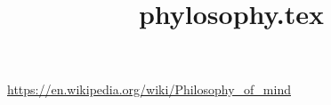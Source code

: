 \documentclass[a4paper]{article}
\title{phylosophy.tex}
\date{}
\begin{document}
    \maketitle

    \url{https://en.wikipedia.org/wiki/Philosophy_of_mind}
    
\end{document}
